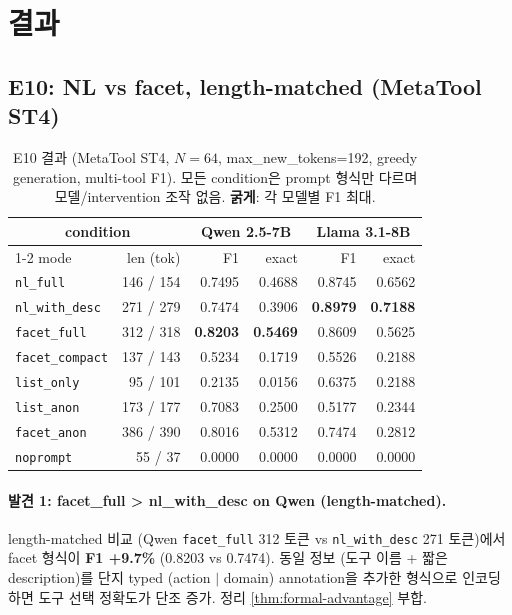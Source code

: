 \documentclass[11pt]{article}
\theoremstyle{plain}
\theoremstyle{definition}
\theoremstyle{remark}
\begin{document}
\section{결과}
\label{sec:results}

\subsection{E10: NL vs facet, length-matched (MetaTool ST4)}
\label{sec:results-e10}

\begin{table}[h]
\centering
\caption{E10 결과 (MetaTool ST4, $N{=}64$, max\_new\_tokens=192, greedy generation, multi-tool F1). 모든 condition은 prompt 형식만 다르며 모델/intervention 조작 없음. \textbf{굵게}: 각 모델별 F1 최대.}
\label{tab:e10-headline}
\small
\begin{tabular}{lrrrrr}
\toprule
\multicolumn{2}{c}{condition} & \multicolumn{2}{c}{Qwen 2.5-7B} & \multicolumn{2}{c}{Llama 3.1-8B} \\
\cmidrule{1-2} \cmidrule{3-4} \cmidrule{5-6}
mode & len (tok) & F1 & exact & F1 & exact \\
\midrule
\texttt{nl\_full}        & 146 / 154 & 0.7495 & 0.4688 & 0.8745 & 0.6562 \\
\texttt{nl\_with\_desc}  & 271 / 279 & 0.7474 & 0.3906 & \textbf{0.8979} & \textbf{0.7188} \\
\texttt{facet\_full}     & 312 / 318 & \textbf{0.8203} & \textbf{0.5469} & 0.8609 & 0.5625 \\
\texttt{facet\_compact}  & 137 / 143 & 0.5234 & 0.1719 & 0.5526 & 0.2188 \\
\texttt{list\_only}      &  95 / 101 & 0.2135 & 0.0156 & 0.6375 & 0.2188 \\
\texttt{list\_anon}      & 173 / 177 & 0.7083 & 0.2500 & 0.5177 & 0.2344 \\
\texttt{facet\_anon}     & 386 / 390 & 0.8016 & 0.5312 & 0.7474 & 0.2812 \\
\texttt{noprompt}        &  55 /  37 & 0.0000 & 0.0000 & 0.0000 & 0.0000 \\
\bottomrule
\end{tabular}
\end{table}

\paragraph{발견 1: facet\_full > nl\_with\_desc on Qwen (length-matched).}
length-matched 비교 (Qwen \texttt{facet\_full} 312 토큰 vs \texttt{nl\_with\_desc} 271 토큰)에서 facet 형식이 \textbf{F1 +9.7\%} (0.8203 vs 0.7474). 동일 정보 (도구 이름 + 짧은 description)를 단지 typed (action $\mid$ domain) annotation을 추가한 형식으로 인코딩하면 도구 선택 정확도가 단조 증가. 정리 \ref{thm:formal-advantage} 부합.
\end{document}
